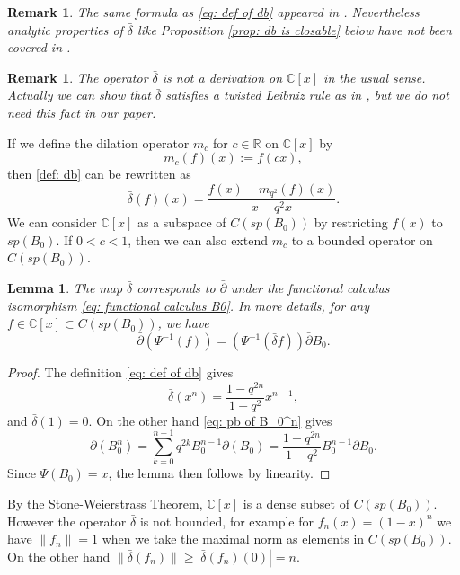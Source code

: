 \documentclass[12pt]{article}
\newtheorem{remark}[definition]{Remark}
\newtheorem{lemma}[definition]{Lemma}
\numberwithin{equation}{section}
\def\pb{\bar{\partial}}
\def\db{\bar{\delta}}
\def\C{{\mathbb C}}
\begin{document}
\begin{remark}
The same formula as \eqref{eq: def of db} appeared in \cite[Section 1.15]{koekoek2010hypergeometric}. Nevertheless  analytic properties of $\db$ like Proposition \ref{prop: db is closable} below have not been covered in \cite{koekoek2010hypergeometric} .
\end{remark}

\begin{remark}
The operator $\db$ is not a derivation on $\C[x]$ in the usual sense. Actually we can show that $\db$ satisfies a twisted Leibniz rule as in \cite[Equation (1.15..5)]{koekoek2010hypergeometric}, but we do not need this fact in our paper.
\end{remark}

If we define the dilation operator $m_{c}$ for $c\in \mathbb{R}$ on $\C[x]$ by 
\begin{equation}\label{eq: mc}
    m_c(f)(x):=f(cx),
\end{equation}
then \eqref{def: db} can be rewritten as
\begin{equation}
    \db(f)(x)=\frac{f(x)-m_{q^2}(f)(x)}{x-q^2x}.
\end{equation}
We can consider $\C[x]$ as a subspace of $C(sp(B_0))$ by restricting $f(x)$ to $sp(B_0)$. If $0<c<1$, then we can also extend $m_c$ to a bounded  operator on $C(sp(B_0))$.

\begin{lemma}\label{lemma: db and pb correspond}
The map $\db$ corresponds to $\pb$ under the functional calculus isomorphism \eqref{eq: functional calculus B0}. In more details, for any $f\in \C[x]\subset C(sp(B_0))$, we have
\begin{equation}\label{eq: db and pb correspond}
\pb(\Psi^{-1}(f))=(\Psi^{-1}(\db f))\pb B_0.
\end{equation}
\end{lemma}
\begin{proof}
The definition \eqref{eq: def of db} gives \[
\db(x^n) = \frac{1 - q^{2n}}{1 - q^2} x^{n-1},
\]
and $\db(1) = 0$. On the other hand 
\eqref{eq: pb of B_0^n} gives \[
\pb(B_0^n) =\sum_{k=0}^{n-1}q^{2k}B_0^{n-1}\pb(B_0)= \frac{1 - q^{2n}}{1 - q^2} B_0^{n-1} \pb B_0.
\]
Since $\Psi(B_0)=x$, the lemma then follows by linearity.
\end{proof}
By the  Stone-Weierstrass Theorem, $\C[x]$ is a dense subset of $C(sp(B_0))$. However the operator $\db$ is not bounded, for example for $f_n(x)=(1-x)^n$ we have $\|f_n\|=1$ when we take the maximal norm as elements in $C(sp(B_0))$. On the other hand $\|\db(f_n)\|\geq |\db(f_n)(0)|=n$.
\end{document}
